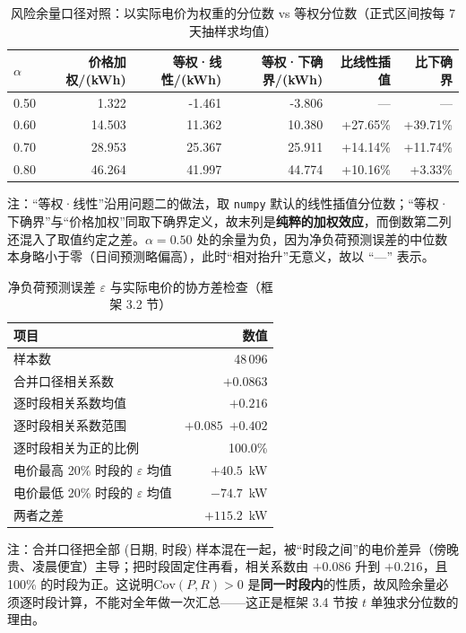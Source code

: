 \begin{table}[htbp]
  \centering
  \caption{风险余量口径对照：以实际电价为权重的分位数 vs 等权分位数（正式区间按每 7 天抽样求均值）}
  \label{tab:p4-risk}
  \footnotesize
  \begin{tabular}{lrrrrr}
    \toprule
    $\alpha$ & 价格加权/(kWh) & 等权·线性/(kWh) & 等权·下确界/(kWh) & 比线性插值 & 比下确界 \\
    \midrule
    0.50 & 1.322 & -1.461 & -3.806 & --- & --- \\
    0.60 & 14.503 & 11.362 & 10.380 & +27.65\% & +39.71\% \\
    0.70 & 28.953 & 25.367 & 25.911 & +14.14\% & +11.74\% \\
    0.80 & 46.264 & 41.997 & 44.774 & +10.16\% & +3.33\% \\
    \bottomrule
  \end{tabular}
  \par\vspace{2pt}
  \begin{minipage}{.92\textwidth}\footnotesize
    注：``等权·线性''沿用问题二的做法，取 \texttt{numpy} 默认的线性插值分位数；``等权·下确界''与``价格加权''同取下确界定义，故末列是\textbf{纯粹的加权效应}，而倒数第二列还混入了取值约定之差。$\alpha=0.50$ 处的余量为负，因为净负荷预测误差的中位数本身略小于零（日间预测略偏高），此时``相对抬升''无意义，故以 ``---'' 表示。
  \end{minipage}
\end{table}

\begin{table}[htbp]
  \centering
  \caption{净负荷预测误差 $\varepsilon$ 与实际电价的协方差检查（框架 3.2 节）}
  \label{tab:p4-cov}
  \footnotesize
  \begin{tabular}{lr}
    \toprule
    项目 & 数值 \\
    \midrule
    样本数 & 48\,096 \\
    合并口径相关系数 & $+0.0863$ \\
    逐时段相关系数均值 & $+0.216$ \\
    逐时段相关系数范围 & $+0.085$~$+0.402$ \\
    逐时段相关为正的比例 & 100.0\% \\
    \midrule
    电价最高 20\% 时段的 $\varepsilon$ 均值 & $+40.5$~kW \\
    电价最低 20\% 时段的 $\varepsilon$ 均值 & $-74.7$~kW \\
    两者之差 & $+115.2$~kW \\
    \bottomrule
  \end{tabular}
  \par\vspace{2pt}
  \begin{minipage}{.92\textwidth}\footnotesize
    注：合并口径把全部 (日期, 时段) 样本混在一起，被``时段之间''的电价差异（傍晚贵、凌晨便宜）主导；把时段固定住再看，相关系数由 $+0.086$ 升到 $+0.216$，且 100\% 的时段为正。这说明$\mathrm{Cov}(P,R)>0$ 是\textbf{同一时段内}的性质，故风险余量必须逐时段计算，不能对全年做一次汇总——这正是框架 3.4 节按 $t$ 单独求分位数的理由。
  \end{minipage}
\end{table}

